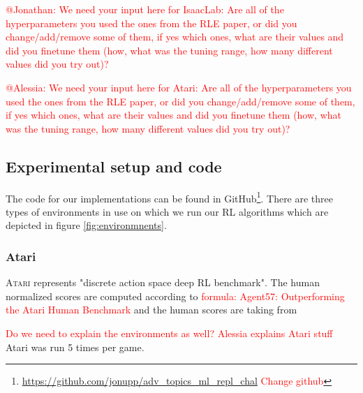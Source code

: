\documentclass[10pt]{article} %
\begin{document}
\noindent \textcolor{red}{@Jonathan: We need your input here for IsaacLab: Are all of the hyperparameters you used the ones from the RLE paper, or did you change/add/remove some of them, if yes which ones, what are their values and did you finetune them (how, what was the tuning range, how many different values did you try out)?}

\noindent \textcolor{red}{@Alessia: We need your input here for Atari: Are all of the hyperparameters you used the ones from the RLE paper, or did you change/add/remove some of them, if yes which ones, what are their values and did you finetune them (how, what was the tuning range, how many different values did you try out)?}

\hypertarget{experimental-setup}{\subsection{Experimental setup and code}}

\noindent The code for our implementations can be found in GitHub\footnote{\href{https://github.com/jonupp/adv_topics_ml_repl_chal}{https://github.com/jonupp/adv\_topics\_ml\_repl\_chal} \textcolor{red}{Change github}}. There are three types of environments in use on which we run our RL algorithms which are depicted in figure \ref{fig:environmnents}. 

\subsubsection{Atari}
\noindent \textsc{Atari} represents "discrete action space deep RL benchmark". The human normalized scores are computed according to \textcolor{red}{formula: Agent57: Outperforming the Atari Human Benchmark} and the human scores are taking from

\noindent \textcolor{red}{Do we need to explain the environments as well?}
\textcolor{red}{Alessia explains Atari stuff} Atari was run 5 times per game.
\end{document}

